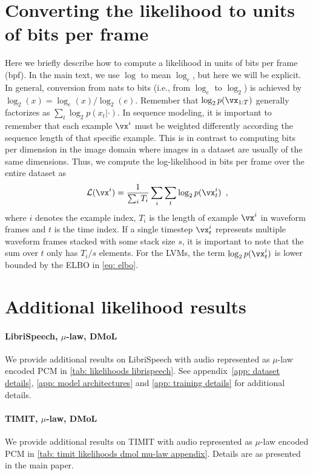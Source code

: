 \section{Converting the likelihood to units of bits per frame}\label{app: likelihood in bits per frame}
Here we briefly describe how to compute a likelihood in units of bits per frame (bpf). In the main text, we use $\log$ to mean $\log_e$, but here we will be explicit. In general, conversion from nats to bits (i.e., from $\log_e$ to $\log_2$) is achieved by $\log_2(x) = \log_e(x)  / \log_2(e) $. Remember that $\log_2 p(\vx_{1:T})$ generally factorizes as $\sum_t \log_2 p(x_t|\cdot)$. In sequence modeling, it is important to remember that each example $\vx^{i}$ must be weighted differently according the sequence length of that specific example. This is in contrast to computing bits per dimension in the image domain where images in a dataset are usually of the same dimensions. Thus, we compute the log-likelihood in bits per frame over the entire dataset as
\begin{equation}
    \mathcal{L}(\vx^{i}) = \frac{1}{\sum_i T_i} \sum_i \sum_t \log_2 p(\vx_t^{i}) \enspace ,
\end{equation}
where $i$ denotes the example index, $T_i$ is the length of example $\vx^i$ in waveform frames and $t$ is the time index. If a single timestep $\vx_t^i$ represents multiple waveform frames stacked with some stack size $s$, it is important to note that the sum over $t$ only has $T_i/s$ elements. 
For the LVMs, the term $\log_2 p(\vx_t^{i})$ is lower bounded by the ELBO in \eqref{eq: elbo}. 


\section{Additional likelihood results} \label{app: additional likelihood results appendix}

\paragraph{LibriSpeech, $\mu$-law, DMoL} We provide additional results on LibriSpeech with audio represented as $\mu$-law encoded PCM in \cref{tab: likelihoods librispeech}. See appendix~\cref{app: dataset details}, \cref{app: model architectures} and \cref{app: training details} for additional details.

\paragraph{TIMIT, $\mu$-law, DMoL} We provide additional results on TIMIT with audio represented as $\mu$-law encoded PCM in \cref{tab: timit likelihoods dmol mu-law appendix}. Details are as presented in the main paper.

